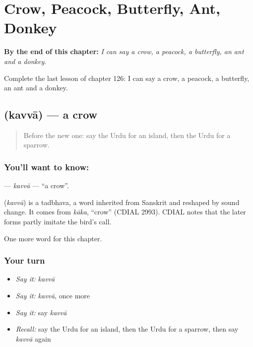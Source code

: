 
\chapter{Crow, Peacock, Butterfly, Ant, Donkey}
\label{ch:ur-crow-peacock-butterfly-ant-donkey}

\begin{chapteropening}
\textbf{By the end of this chapter:} \emph{I can say a crow, a peacock, a butterfly, an ant and a donkey.}

Complete the last lesson of chapter 126: I can say a crow, a peacock, a butterfly, an ant and a donkey.
\end{chapteropening}

\section[\texorpdfstring{\ur{کوا} (kavvā)}{کوا (kavvā)}]{ (kavvā) — a crow}

\label{lesson:UR-C126-kavva}



\begin{quote}
Before the new one: say the Urdu for an island, then the Urdu for a sparrow.
\end{quote}

\subsection*{You'll want to know: }
\textbf{} — \emph{kavvā} — \textquotedblleft{}a crow\textquotedblright{}.

\begin{cousinweb}
\textbf{} (\emph{kavvā}) is a tadbhava, a word inherited from Sanskrit and reshaped by sound change. It comes from \emph{kāka}, \textquotedblleft{}crow\textquotedblright{} (CDIAL 2993). CDIAL notes that the later forms partly imitate the bird's call.
\end{cousinweb}

\begin{grammarlens}[title={What you've built}]
One more word for this chapter.
\end{grammarlens}

\subsection*{Your turn}
\begin{itemize}
\raggedright
  \item \emph{Say it:} \emph{kavvā}
  \item \emph{Say it:} \emph{kavvā}, once more
  \item \emph{Say it:} say \emph{kavvā}
  \item \emph{Recall:} say the Urdu for an island, then the Urdu for a sparrow, then say \emph{kavvā} again
\end{itemize}

